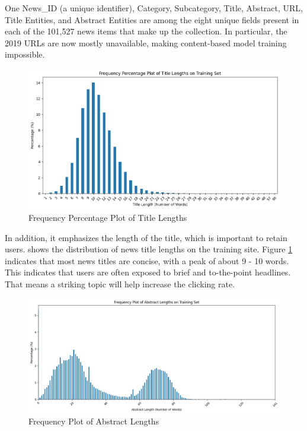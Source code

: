 \documentclass[9pt,twocolumn,twoside,lineno]{gsajnl}
\begin{document}
One News\_ID (a unique identifier), Category, Subcategory, Title, Abstract, URL, Title Entities, and Abstract Entities are among the eight unique fields present in each of the 101,527 news items that make up the collection. In particular, the 2019 URLs are now mostly unavailable, making content-based model training impossible. 

\begin{figure}
    \centering
    \includegraphics[width=\linewidth]{material/1.png}
    \caption{Frequency Percentage Plot of Title Lengths}
    \label{fig:1}
\end{figure}

In addition, it emphasizes the length of the title, which is important to retain users. shows the distribution of news title lengths on the training site. Figure \ref{fig:1} indicates that most news titles are concise, with a peak of about 9 - 10 words. This indicates that users are often exposed to brief and to-the-point headlines. That means a striking topic will help increase the clicking rate. 

\begin{figure}
    \centering
    \includegraphics[width=\linewidth]{material/2.png}
    \caption{Frequency Plot of Abstract Lengths}
    \label{fig:2}
\end{figure}
\end{document}
